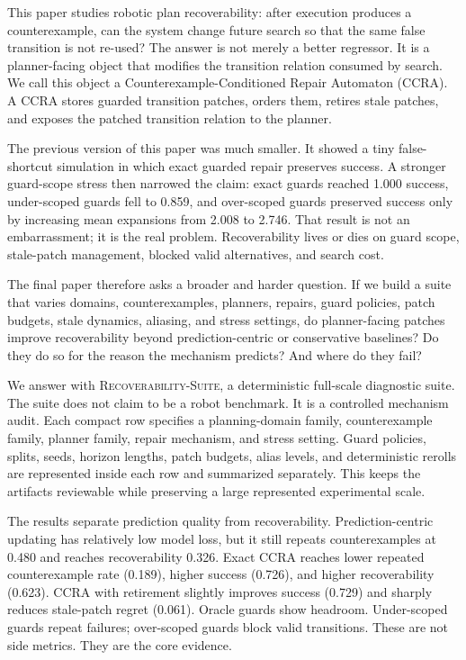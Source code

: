 \documentclass{article}
\newcommand{\ccra}{\textsc{CCRA}}
\newcommand{\suite}{\textsc{Recoverability-Suite}}
\begin{document}
This paper studies robotic plan recoverability: after execution produces a
counterexample, can the system change future search so that the same false
transition is not re-used? The answer is not merely a better regressor. It is a
planner-facing object that modifies the transition relation consumed by search.
We call this object a Counterexample-Conditioned Repair Automaton (\ccra). A
\ccra{} stores guarded transition patches, orders them, retires stale patches,
and exposes the patched transition relation to the planner.

The previous version of this paper was much smaller. It showed a tiny
false-shortcut simulation in which exact guarded repair preserves success. A
stronger guard-scope stress then narrowed the claim: exact guards reached 1.000
success, under-scoped guards fell to 0.859, and over-scoped guards preserved
success only by increasing mean expansions from 2.008 to 2.746. That result is
not an embarrassment; it is the real problem. Recoverability lives or dies on
guard scope, stale-patch management, blocked valid alternatives, and search cost.

The final paper therefore asks a broader and harder question. If we build a
suite that varies domains, counterexamples, planners, repairs, guard policies,
patch budgets, stale dynamics, aliasing, and stress settings, do planner-facing
patches improve recoverability beyond prediction-centric or conservative
baselines? Do they do so for the reason the mechanism predicts? And where do
they fail?

We answer with \suite{}, a deterministic full-scale diagnostic suite. The suite
does not claim to be a robot benchmark. It is a controlled mechanism audit. Each
compact row specifies a planning-domain family, counterexample family, planner
family, repair mechanism, and stress setting. Guard policies, splits, seeds,
horizon lengths, patch budgets, alias levels, and deterministic rerolls are
represented inside each row and summarized separately. This keeps the artifacts
reviewable while preserving a large represented experimental scale.

The results separate prediction quality from recoverability. Prediction-centric
updating has relatively low model loss, but it still repeats counterexamples at
0.480 and reaches recoverability 0.326. Exact \ccra{} reaches lower repeated
counterexample rate (0.189), higher success (0.726), and higher recoverability
(0.623). \ccra{} with retirement slightly improves success (0.729) and sharply
reduces stale-patch regret (0.061). Oracle guards show headroom. Under-scoped
guards repeat failures; over-scoped guards block valid transitions. These are
not side metrics. They are the core evidence.
\end{document}

